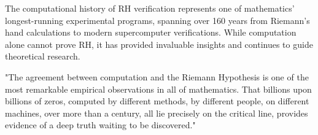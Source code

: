 The computational history of RH verification represents one of mathematics' longest-running experimental programs, spanning over 160 years from Riemann's hand calculations to modern supercomputer verifications. While computation alone cannot prove RH, it has provided invaluable insights and continues to guide theoretical research.

\begin{remark}
"The agreement between computation and the Riemann Hypothesis is one of the most remarkable empirical observations in all of mathematics. That billions upon billions of zeros, computed by different methods, by different people, on different machines, over more than a century, all lie precisely on the critical line, provides evidence of a deep truth waiting to be discovered."
\end{remark}